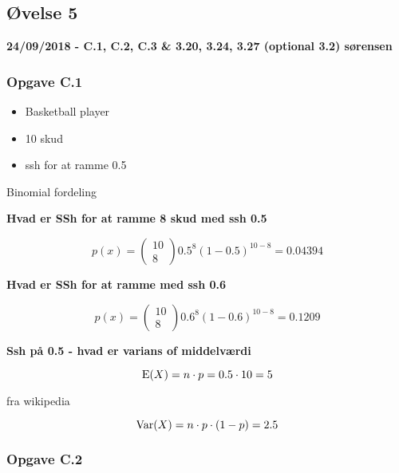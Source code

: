 \subsection{Øvelse 5}

\textbf{24/09/2018 - C.1, C.2, C.3 \&  3.20, 3.24, 3.27 (optional 3.2) sørensen}

\subsubsection{Opgave C.1}

\begin{itemize}
    \item Basketball player
    \item 10 skud
    \item ssh for at ramme 0.5
\end{itemize}

Binomial fordeling

\textbf{Hvad er SSh for at ramme 8 skud med ssh 0.5}

\begin{equation}
    p(x) = \begin{pmatrix}
    10 \\ 8 \end{pmatrix} 0.5^8 (1-0.5)^{10-8} = 0.04394
\end{equation}

\textbf{Hvad er SSh for at ramme med ssh 0.6}

\begin{equation}
    p(x) = \begin{pmatrix}
    10 \\ 8 \end{pmatrix} 0.6^8 (1-0.6)^{10-8} = 0.1209
\end{equation}

\textbf{Ssh på 0.5 - hvad er varians of middelværdi}

\begin{equation}
    \text{E}(X) = n\cdot p = 0.5 \cdot 10 = 5
\end{equation}

fra wikipedia

\begin{equation}
    \text{Var}(X) = n \cdot p \cdot (1 - p) = 2.5
\end{equation}

\subsubsection{Opgave C.2}

